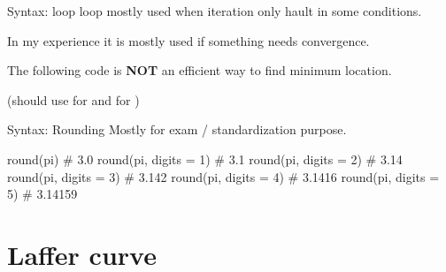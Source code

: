 \documentclass[11pt,aspectratio=43,usenames,dvipsnames]{beamer}
\theoremstyle{definition}
\begin{document}
\begin{frame}[fragile]{Syntax:  loop}
\label{slide:Syntax___mintinline_julia__while__loop}
     loop mostly used when iteration only hault in some conditions.

    In my experience it is mostly used if something needs convergence.

    The following code is \textbf{NOT} an efficient way to find minimum location.

    (should use  for  and  for )


\end{frame}

\begin{frame}[fragile]{Syntax: Rounding}
\label{slide:Syntax__Rounding}
    Mostly for exam / standardization purpose.

    \begin{juliacode}
        round(pi)               # 3.0
        round(pi, digits = 1)   # 3.1
        round(pi, digits = 2)   # 3.14
        round(pi, digits = 3)   # 3.142
        round(pi, digits = 4)   # 3.1416
        round(pi, digits = 5)   # 3.14159
    \end{juliacode}
\end{frame}

\section{Laffer curve}
\label{sec:Laffer_curve}
\end{document}

